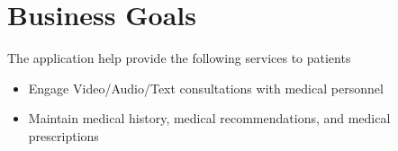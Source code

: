 \documentclass[class=article, crop=false]{standalone}
\begin{document}
    \section{Business Goals}
    The application help provide the following services to patients

    \begin{itemize}
        \item Engage Video/Audio/Text consultations with medical personnel
        \item Maintain medical history, medical recommendations, and medical prescriptions
    \end{itemize}
\end{document}
